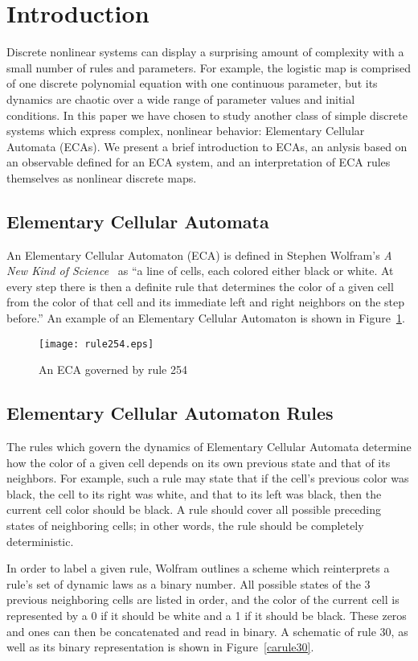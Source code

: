 \section{Introduction}
Discrete nonlinear systems can display a surprising amount of
complexity with a small number of rules and parameters.
For example, the logistic map is comprised of one discrete polynomial
equation with one continuous parameter, but its dynamics are chaotic
over a wide range of parameter values and initial conditions.
In this paper we have chosen to study another class of simple discrete
systems which express complex, nonlinear behavior: Elementary Cellular
Automata (ECAs).
We present a brief introduction to ECAs, an anlysis based on an
observable defined for an ECA system, and an interpretation of ECA
rules themselves as nonlinear discrete maps.


\subsection{Elementary Cellular Automata}
An Elementary Cellular Automaton (ECA) is defined in Stephen Wolfram's
\emph{A New Kind of Science}~\cite{anks} as ``a line of cells, each
colored either black or white. At every step there is then a definite
rule that determines the color of a given cell from the color of that
cell and its immediate left and right neighbors on the step before.''
An example of an Elementary Cellular Automaton is shown in
Figure~\ref{rule254}.

\begin{figure}
    \centering
    \texttt{[image: rule254.eps]}
    \caption{\label{rule254} An ECA governed by rule 254}
\end{figure}

\subsection{Elementary Cellular Automaton Rules}
The rules which govern the dynamics of Elementary Cellular Automata
determine how the color of a given cell depends on its own previous
state and that of its neighbors.
For example, such a rule may state that if the cell's previous color
was black, the cell to its right was white, and that to its left was
black, then the current cell color should be black.
A rule should cover all possible preceding states of neighboring
cells; in other words, the rule should be completely deterministic.

In order to label a given rule, Wolfram outlines a scheme which
reinterprets a rule's set of dynamic laws as a binary number.
All possible states of the 3 previous neighboring cells are listed in
order, and the color of the current cell is represented by a 0 if it
should be white and a 1 if it should be black.
These zeros and ones can then be concatenated and read in binary.
A schematic of rule 30, as well as its binary representation is shown
in Figure~\ref{carule30}.

